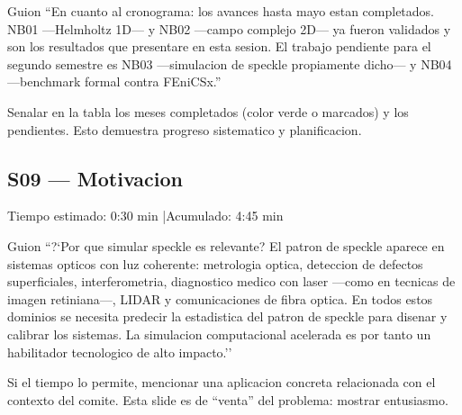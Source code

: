 \begin{slidebox}{Guion}
``En cuanto al cronograma: los avances hasta mayo estan completados. NB01
---Helmholtz 1D--- y NB02 ---campo complejo 2D--- ya fueron validados y son
los resultados que presentare en esta sesion. El trabajo pendiente para el
segundo semestre es NB03 ---simulacion de speckle propiamente dicho--- y NB04
---benchmark formal contra FEniCSx.''
\end{slidebox}
\vspace{4pt}

\begin{tipbox}
Senalar en la tabla los meses completados (color verde o marcados) y los pendientes.
Esto demuestra progreso sistematico y planificacion.
\end{tipbox}

\vspace{8pt}

\subsection{S09 --- Motivacion}

\begin{timebox}
Tiempo estimado: 0:30 min \quad|\quad Acumulado: 4:45 min
\end{timebox}
\vspace{4pt}

\begin{slidebox}{Guion}
``?`Por que simular speckle es relevante? El patron de speckle aparece en
sistemas opticos con luz coherente: metrologia optica, deteccion de defectos
superficiales, interferometria, diagnostico medico con laser ---como en tecnicas
de imagen retiniana---, LIDAR y comunicaciones de fibra optica. En todos estos
dominios se necesita predecir la estadistica del patron de speckle para disenar
y calibrar los sistemas. La simulacion computacional acelerada es por tanto un
habilitador tecnologico de alto impacto.''
\end{slidebox}
\vspace{4pt}

\begin{tipbox}
Si el tiempo lo permite, mencionar una aplicacion concreta relacionada con el
contexto del comite. Esta slide es de ``venta'' del problema: mostrar entusiasmo.
\end{tipbox}

